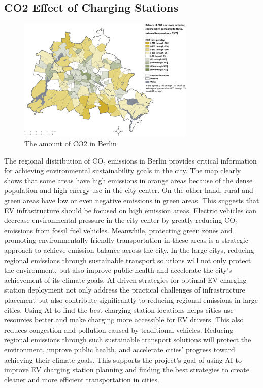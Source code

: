 \subsection{CO2 Effect of Charging Stations}
\begin{figure}[hbt!]
\begin{center}
\includegraphics[width=0.75\textwidth]{Bilder/kaan5.png}
\caption{The amount of CO2 in Berlin}\label{fig:kaan5}
\end{center}
\end{figure}
The regional distribution of CO₂ emissions in Berlin provides critical information for achieving environmental sustainability goals in the city. The map clearly shows that some areas have high emissions in orange areas because of the dense population and high energy use in the city center. On the other hand, rural and green areas have low or even negative emissions in green areas. This suggests that EV infrastructure should be focused on high emission areas. Electric vehicles can decrease environmental pressure in the city center by greatly reducing CO₂ emissions from fossil fuel vehicles. Meanwhile, protecting green zones and promoting environmentally friendly transportation in these areas is a strategic approach to achieve emission balance across the city.
In the large citys, reducing regional emissions through sustainable transport solutions will not only protect the environment, but also improve public health and accelerate the city's achievement of its climate goals. AI-driven strategies for optimal EV charging station deployment not only address the practical challenges of infrastructure placement but also contribute significantly to reducing regional emissions in large cities. Using AI to find the best charging station locations helps cities use resources better and make charging more accessible for EV drivers. This also reduces congestion and pollution caused by traditional vehicles. Reducing regional emissions through such sustainable transport solutions will protect the environment, improve public health, and accelerate cities' progress toward achieving their climate goals. This supports the project's goal of using AI to improve EV charging station planning and finding the best strategies to create cleaner and more efficient transportation in cities.

